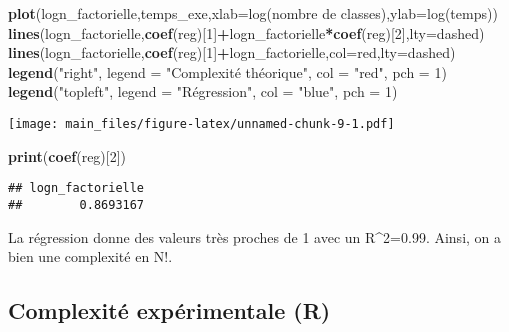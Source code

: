 \documentclass[
]{article}
\newenvironment{Shaded}{\begin{snugshade}}{\end{snugshade}}
\newcommand{\AttributeTok}[1]{\textcolor[rgb]{0.13,0.29,0.53}{#1}}
\newcommand{\DecValTok}[1]{\textcolor[rgb]{0.00,0.00,0.81}{#1}}
\newcommand{\FunctionTok}[1]{\textcolor[rgb]{0.13,0.29,0.53}{\textbf{#1}}}
\newcommand{\NormalTok}[1]{#1}
\newcommand{\SpecialCharTok}[1]{\textcolor[rgb]{0.81,0.36,0.00}{\textbf{#1}}}
\newcommand{\StringTok}[1]{\textcolor[rgb]{0.31,0.60,0.02}{#1}}
\begin{document}
\begin{Shaded}
\begin{Highlighting}[]
\FunctionTok{plot}\NormalTok{(logn\_factorielle,temps\_exe,}\AttributeTok{xlab=}\StringTok{\textquotesingle{}log(nombre de classes)\textquotesingle{}}\NormalTok{,}\AttributeTok{ylab=}\StringTok{\textquotesingle{}log(temps)\textquotesingle{}}\NormalTok{)}
\FunctionTok{lines}\NormalTok{(logn\_factorielle,}\FunctionTok{coef}\NormalTok{(reg)[}\DecValTok{1}\NormalTok{]}\SpecialCharTok{+}\NormalTok{logn\_factorielle}\SpecialCharTok{*}\FunctionTok{coef}\NormalTok{(reg)[}\DecValTok{2}\NormalTok{],}\AttributeTok{lty=}\StringTok{\textquotesingle{}dashed\textquotesingle{}}\NormalTok{)}
\FunctionTok{lines}\NormalTok{(logn\_factorielle,}\FunctionTok{coef}\NormalTok{(reg)[}\DecValTok{1}\NormalTok{]}\SpecialCharTok{+}\NormalTok{logn\_factorielle,}\AttributeTok{col=}\StringTok{\textquotesingle{}red\textquotesingle{}}\NormalTok{,}\AttributeTok{lty=}\StringTok{\textquotesingle{}dashed\textquotesingle{}}\NormalTok{)}
\FunctionTok{legend}\NormalTok{(}\StringTok{"right"}\NormalTok{, }\AttributeTok{legend =} \StringTok{"Complexité théorique"}\NormalTok{, }\AttributeTok{col =} \StringTok{"red"}\NormalTok{, }\AttributeTok{pch =} \DecValTok{1}\NormalTok{)}
\FunctionTok{legend}\NormalTok{(}\StringTok{"topleft"}\NormalTok{, }\AttributeTok{legend =} \StringTok{"Régression"}\NormalTok{, }\AttributeTok{col =} \StringTok{"blue"}\NormalTok{, }\AttributeTok{pch =} \DecValTok{1}\NormalTok{)}
\end{Highlighting}
\end{Shaded}

\texttt{[image: main\_files/figure-latex/unnamed-chunk-9-1.pdf]}

\begin{Shaded}
\begin{Highlighting}[]
\FunctionTok{print}\NormalTok{(}\FunctionTok{coef}\NormalTok{(reg)[}\DecValTok{2}\NormalTok{])}
\end{Highlighting}
\end{Shaded}

\begin{verbatim}
## logn_factorielle 
##        0.8693167
\end{verbatim}

La régression donne des valeurs très proches de 1 avec un R\^{}2=0.99.
Ainsi, on a bien une complexité en N!.

\hypertarget{complexituxe9-expuxe9rimentale-r}{%
\subsection{Complexité expérimentale
(R)}\label{complexituxe9-expuxe9rimentale-r}}
\end{document}
